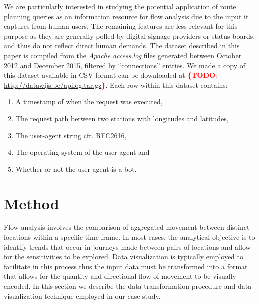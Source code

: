 \documentclass{sig-alternate}
\newcommand{\todo}[1]{\noindent\textcolor{red}{{\bf \{TODO}: #1{\bf \}}}}
\begin{document}
We are particularly interested in studying the potential application of route planning queries as an information resource for flow analysis due to the input it captures from human users.
The remaining features are less relevant for this purpose as they are generally polled by digital signage providers or status boards, and thus do not reflect direct human demands.
The dataset described in this paper is compiled from the \emph{Apache} \emph{access.log} files generated between October 2012 and December 2015, filtered by ``connections'' entries.
We made a copy of this dataset available in CSV format can be downloaded at \todo{\url{http://datawijs.be/apilog.tar.gz}}.
Each row within this dataset contains:
\begin{enumerate}
\item A timestamp of when the request was executed,
\item The request path between two stations with longitudes and latitudes,
\item The user-agent string cfr. RFC2616,
\item The operating system of the user-agent and
\item Whether or not the user-agent is a bot.
\end{enumerate}

\section{Method}
\label{sec:method}

Flow analysis involves the comparison of aggregated movement between distinct locations within a specific time frame. 
In most cases, the analytical objective is to identify trends that occur in journeys made between pairs of locations and allow for the sensitivities to be explored. 
Data visualization is typically employed to facilitate in this process thus the input data must be transformed into a format that allows for the quantity and directional flow of movement to be visually encoded. In this section we describe the data transformation procedure and data visualization technique employed in our case study.
\end{document}
